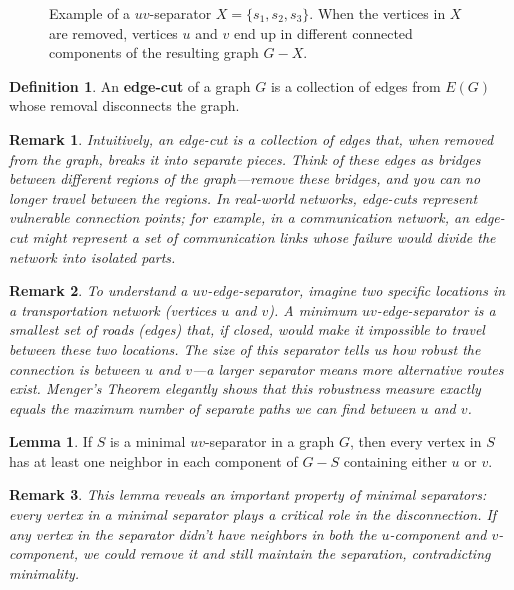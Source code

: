 \documentclass{article}
\newtheorem{remark}{Remark}
\theoremstyle{definition}
\newtheorem{lemma}{Lemma}
\newtheorem{definition}{Definition}
\begin{document}
\begin{figure}[ht]
\caption{Example of a $uv$-separator $X = \{s_1, s_2, s_3\}$. When the vertices in $X$ are removed, vertices $u$ and $v$ end up in different connected components of the resulting graph $G - X$.}
\label{fig:uv-separator}
\end{figure}

\begin{definition}
    An \textbf{edge-cut} of a graph $G$ is a collection of edges from $E(G)$ whose removal disconnects the graph.
\end{definition}

\begin{remark}
Intuitively, an edge-cut is a collection of edges that, when removed from the graph, breaks it into separate pieces. Think of these edges as bridges between different regions of the graph—remove these bridges, and you can no longer travel between the regions. In real-world networks, edge-cuts represent vulnerable connection points; for example, in a communication network, an edge-cut might represent a set of communication links whose failure would divide the network into isolated parts.
\end{remark}

\begin{remark}
To understand a $uv$-edge-separator, imagine two specific locations in a transportation network (vertices $u$ and $v$). A minimum $uv$-edge-separator is a smallest set of roads (edges) that, if closed, would make it impossible to travel between these two locations. The size of this separator tells us how robust the connection is between $u$ and $v$—a larger separator means more alternative routes exist. Menger's Theorem elegantly shows that this robustness measure exactly equals the maximum number of separate paths we can find between $u$ and $v$.
\end{remark}

\begin{lemma}
If $S$ is a minimal $uv$-separator in a graph $G$, then every vertex in $S$ has at least one neighbor in each component of $G - S$ containing either $u$ or $v$.
\end{lemma}

\begin{remark}
This lemma reveals an important property of minimal separators: every vertex in a minimal separator plays a critical role in the disconnection. If any vertex in the separator didn't have neighbors in both the $u$-component and $v$-component, we could remove it and still maintain the separation, contradicting minimality.
\end{remark}
\end{document}
